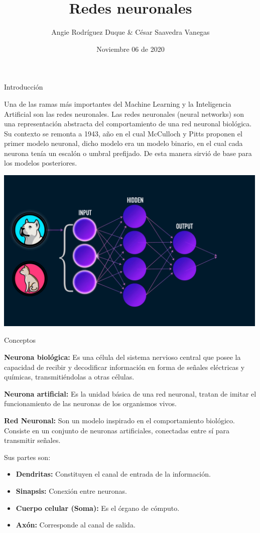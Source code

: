\documentclass[
  ignorenonframetext,
]{beamer}
\title{Redes neuronales}
\author{Angie Rodríguez Duque \& César Saavedra Vanegas}
\date{Noviembre 06 de 2020}
\begin{document}
\frame{\titlepage}

\begin{frame}

\begin{block}{Introducción}

Una de las ramas más importantes del Machine Learning y la Inteligencia
Artificial son las redes neuronales. Las redes neuronales (neural
networks) son una representación abstracta del comportamiento de una red
neuronal biológica. Su contexto se remonta a 1943, año en el cual
McCulloch y Pitts proponen el primer modelo neuronal, dicho modelo era
un modelo binario, en el cual cada neurona tenía un escalón o umbral
prefijado. De esta manera sirvió de base para los modelos posteriores.

\includegraphics[width=5.20833in,height=\textheight]{4.gif}

\end{block}

\begin{block}{Conceptos}

\textbf{Neurona biológica:} Es una célula del sistema nervioso central
que posee la capacidad de recibir y decodificar información en forma de
señales eléctricas y químicas, transmitiéndolas a otras células.

\textbf{Neurona artificial:} Es la unidad básica de una red neuronal,
tratan de imitar el funcionamiento de las neuronas de los organismos
vivos.

\textbf{Red Neuronal:} Son un modelo inspirado en el comportamiento
biológico. Consiste en un conjunto de neuronas artificiales, conectadas
entre sí para transmitir señales.

Sus partes son:

\begin{itemize}
\item
  \textbf{Dendritas:} Constituyen el canal de entrada de la información.
\item
  \textbf{Sinapsis:} Conexión entre neuronas.
\item
  \textbf{Cuerpo celular (Soma):} Es el órgano de cómputo.
\item
  \textbf{Axón:} Corresponde al canal de salida.
\end{itemize}


\end{block}
\end{frame}
\end{document}

